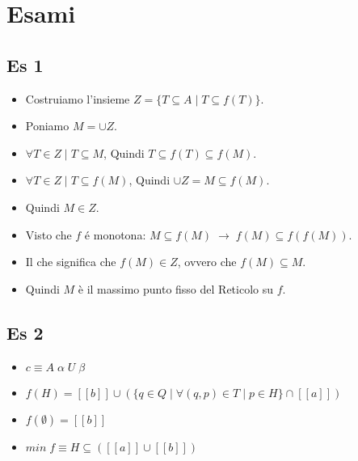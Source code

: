 \chapter{Esami}

\section{Es 1}

\begin{itemize}
    \item Costruiamo l’insieme $Z = \{ T \subseteq A \; | \; T \subseteq f(T) \}$.
    \item Poniamo $M = \cup Z$.
    \item $\forall T \in Z \; | \; T \subseteq M$, Quindi $T \subseteq f(T) \subseteq f(M)$.
    \item $\forall T \in Z \; | \; T \subseteq f(M)$, Quindi $\cup Z = M \subseteq f(M)$.
    \item Quindi $M \in Z$.
    \item Visto che $f$ \'e monotona: $M \subseteq f(M) \; \rightarrow \; f(M) \subseteq f(f(M))$.
    \item Il che significa che $f(M) \in Z$, ovvero che $f(M) \subseteq M$.
    \item Quindi $M$ \`e il massimo punto fisso del Reticolo su $f$.
\end{itemize}

\section{Es 2}

\begin{itemize}
    \item $c \equiv A \; \alpha \; U \; \beta$
    \item $f(H) = [[b]] \cup (\{q \in Q \; | \; \forall(q,p) \in T \; | \; p \in H\} \cap [[a]])$
    \item $f(\emptyset) = [[b]]$
    \item $min \; f \equiv H \subseteq ([[a]] \cup [[b]])$
\end{itemize}
